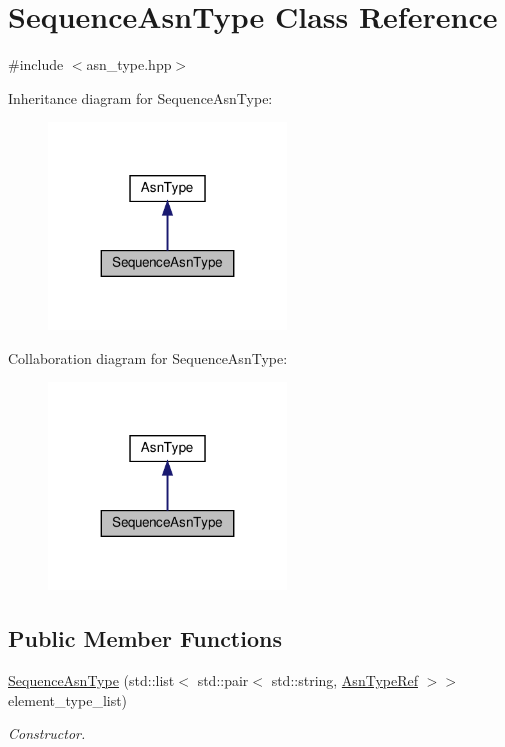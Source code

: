 \hypertarget{classSequenceAsnType}{}\section{Sequence\+Asn\+Type Class Reference}
\label{classSequenceAsnType}


{\ttfamily \#include $<$asn\+\_\+type.\+hpp$>$}



Inheritance diagram for Sequence\+Asn\+Type\+:
\nopagebreak
\begin{figure}[H]
\begin{center}
\leavevmode
\includegraphics[width=179pt]{da/df5/classSequenceAsnType__inherit__graph}
\end{center}
\end{figure}


Collaboration diagram for Sequence\+Asn\+Type\+:
\nopagebreak
\begin{figure}[H]
\begin{center}
\leavevmode
\includegraphics[width=179pt]{d7/df5/classSequenceAsnType__coll__graph}
\end{center}
\end{figure}
\subsection*{Public Member Functions}
\begin{DoxyCompactItemize}
\item 
\hyperlink{classSequenceAsnType_a8d98a4d00f2a56565fb2a11100fe08c7}{Sequence\+Asn\+Type} (std\+::list$<$ std\+::pair$<$ std\+::string, \hyperlink{asn__type_8hpp_a456d7cf50c15d087cc0428ae80834b35}{Asn\+Type\+Ref} $>$$>$ element\+\_\+type\+\_\+list)
\begin{DoxyCompactList}\small\item\em Constructor. \end{DoxyCompactList}\end{DoxyCompactItemize}
